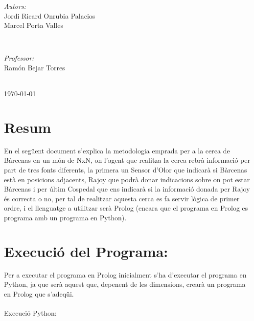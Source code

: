 \documentclass[11pt]{article}
\begin{document}
\begin{titlepage}
		\begin{minipage}{0.4\textwidth}
			\begin{flushleft} \large
				\emph{Autors:}\\
				Jordi Ricard Onrubia Palacios\\
				Marcel Porta Valles
			\end{flushleft}
		\end{minipage}
		~
		\begin{minipage}{0.4\textwidth}
			\begin{flushright} \large
				\emph{Professor:} \\
				Ramón Bejar Torres
			\end{flushright}
		\end{minipage}\\[4cm]
		
		{\large \today}\\[3cm] %
		\vfill %
	\end{titlepage}
\newpage
\section*{Resum}
En el següent document s'explica la metodologia emprada per a la cerca de Bàrcenas en un món de NxN, on l'agent que realitza la cerca rebrà informació per part de tres fonts diferents, la primera un Sensor d'Olor que indicarà si Bàrcenas està en posicions adjacents, Rajoy que podrà donar indicacions sobre on pot estar Bàrcenas i per últim Cospedal que ens indicarà si la informació donada per Rajoy és correcta o no, per tal de realitzar aquesta cerca es fa servir lògica de primer ordre, i el llenguatge a utilitzar serà Prolog (encara que el programa en Prolog es programa amb un programa en Python).
\thispagestyle{empty}
\clearpage
\thispagestyle{empty}
\newpage
\tableofcontents
\newpage
{}
\section{Execució del Programa:}
Per a executar el programa en Prolog inicialment s'ha d'executar el programa en Python, ja que serà aquest que, depenent de les dimensions, crearà un programa en Prolog que s'adeqüi.\\\\
Execució Python:\\
\end{document}
